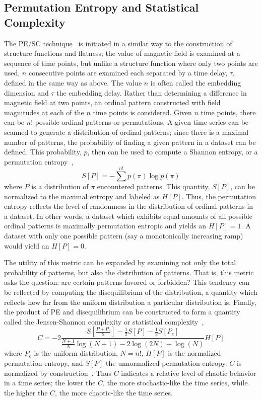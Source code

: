 \documentclass[aip,pop,amsmath,amssymb,preprint,superscriptaddress]{revtex4-1} %
\begin{document}
\subsection{Permutation Entropy and Statistical Complexity}

The PE/SC technique~\cite{bandt2002,rosso2007,weck2015} is initiated in a similar way to the construction of structure functions and flatness; the value of magnetic field is examined at a sequence of time points, but unlike a structure function where only two points are used, $n$ consecutive points are examined each separated by a time delay, $\tau$, defined in the same way as above. The value $n$ is often called the embedding dimension and $\tau$ the embedding delay. Rather than determining a difference in magnetic field at two points, an ordinal pattern constructed with field magnitudes at each of the $n$ time points is considered. Given $n$ time points, there can be $n!$ possible ordinal patterns or permutations. A given time series can be scanned to generate a distribution of ordinal patterns; since there is a maximal number of patterns, the probability of finding a given pattern in a dataset can be defined. This probability, $p$, then can be used to compute a Shannon entropy, or a permutation entropy~\cite{bandt2002},
\begin{equation}
S[P]  = -\sum^{n!} p(\pi) \log p(\pi)
\label{eq:pe}
\end{equation}
where $P$ is a distribution of $\pi$ encountered patterns. This quantity, $S[P]$, can be normalized to the maximal entropy and labeled as $H[P]$. Thus, the permutation entropy reflects the level of randomness in the distribution of ordinal patterns in a dataset. In other words, a dataset which exhibits equal amounts of all possible ordinal patterns is maximally permutation entropic and yields an $H[P] = 1$. A dataset with only one possible pattern (say a monotonically increasing ramp) would yield an $H[P] = 0$.

The utility of this metric can be expanded by examining not only the total probability of patterns, but also the distribution of patterns. That is, this metric asks the question: are certain patterns favored or forbidden? This tendency can be reflected by computing the disequilibrium of the distribution, a quantity which reflects how far from the uniform distribution a particular distribution is. Finally, the product of PE and disequilibrium can be constructed to form a quantity called the Jensen-Shannon complexity or statistical complexity~\cite{weck2015}, 
\begin{equation}
C = -2\frac{S \left[ \frac{P+P_e}{2} \right] - \frac{1}{2}S[P]-\frac{1}{2}S[P_e] }{\frac{N+1}{N} \log(N+1)-2 \log(2N)+\log(N)}H[P]
\label{eq:sc}
\end{equation}
where $P_e$ is the uniform distribution, $N=n!$, $H[P]$ is the normalized permutation entropy, and $S[P]$ the unnormalized permutation entropy. $C$ is normalized by construction~\cite{lamberti2004}.
Thus $C$ indicates a relative level of chaotic behavior in a time series; the lower the $C$, the more stochastic-like the time series, while the higher the $C$, the more chaotic-like the time series.
\end{document}

